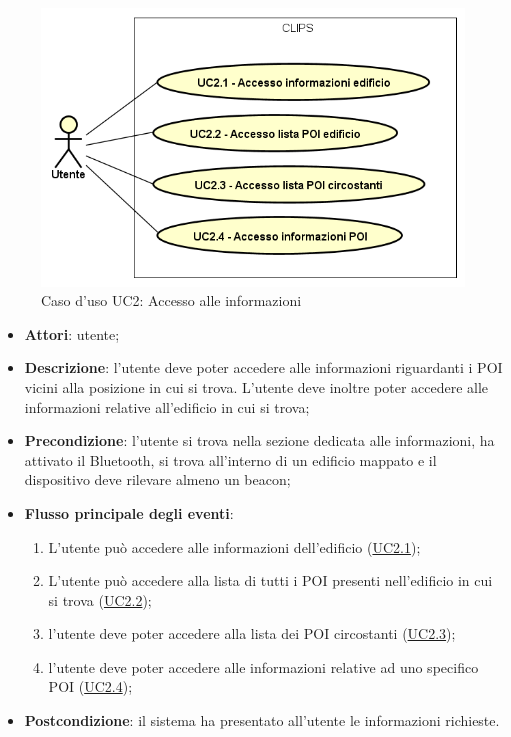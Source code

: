 \documentclass[../AnalisiDeiRequisiti.tex]{subfiles}
\begin{document}
\begin{figure}[H]
	\centering
	\includegraphics[scale=0.95, width=\textwidth]{img/UC2.png}
	\caption{Caso d'uso UC2: Accesso alle informazioni}\label{fig:UC2} 
\end{figure}
\begin{itemize}
	\item \textbf{Attori}: utente;
	\item \textbf{Descrizione}: l'utente deve poter accedere alle informazioni riguardanti i POI vicini alla posizione in cui si trova. L'utente deve inoltre poter accedere alle informazioni relative all'edificio in cui si trova; 
	\item \textbf{Precondizione}: l'utente si trova nella sezione dedicata alle informazioni, ha attivato il Bluetooth, si trova all'interno di un edificio mappato e il dispositivo deve rilevare almeno un beacon;
	
	\item \textbf{Flusso principale degli eventi}:
	\begin{enumerate}
		\item L'utente può accedere alle informazioni dell'edificio (\hyperlink{UC2.1}{UC2.1});
		\item L'utente può accedere alla lista di tutti i POI presenti nell'edificio in cui si trova (\hyperlink{UC2.2}{UC2.2});
		\item l'utente deve poter accedere alla lista dei POI circostanti (\hyperlink{UC2.3}{UC2.3});
		\item l'utente deve poter accedere alle informazioni relative ad uno specifico POI (\hyperlink{UC2.4}{UC2.4});
		
	\end{enumerate}
	\item \textbf{Postcondizione}: il sistema ha presentato all'utente le informazioni richieste.
\end{itemize}
\hypertarget{UC2.1}{}
\end{document}
